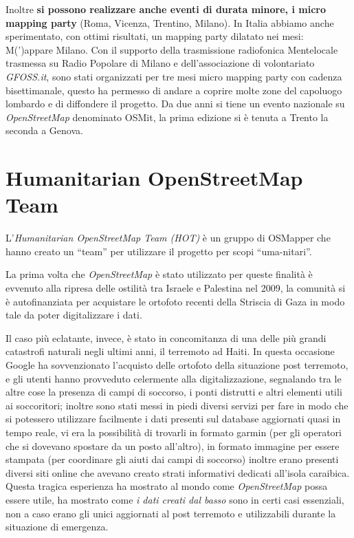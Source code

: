 \documentclass[a4paper,twoside,12pt,]{article}
\newcommand{\osm}{\emph{OpenStreetMap}\xspace}
\newcommand{\pro}[1]{\emph{#1}}
\begin{document}
Inoltre \textbf{si possono realizzare anche eventi di durata minore, i micro mapping party} (Roma, Vicenza, Trentino, Milano). In Italia abbiamo anche sperimentato, con ottimi risultati, un mapping party dilatato nei mesi: M(')appare Milano. Con il supporto della trasmissione radiofonica Mentelocale trasmessa su Radio Popolare di Milano e dell'associazione di volontariato \pro{GFOSS.it}, sono stati organizzati per tre mesi micro mapping party con cadenza bisettimanale, questo ha permesso di andare a coprire molte zone del capoluogo lombardo e di diffondere il progetto. Da due anni si tiene un evento nazionale su \osm denominato OSMit, la prima edizione si è tenuta a Trento la seconda a Genova.
\section{Humanitarian OpenStreetMap Team}
L'\pro{Humanitarian OpenStreetMap Team (HOT)} è un gruppo di OSMapper che hanno creato un ``team'' per utilizzare il progetto per scopi ``uma-nitari''.

La prima volta che \osm è stato utilizzato per queste finalità è evvenuto alla ripresa delle ostilità tra Israele e Palestina nel 2009, la comunità si è autofinanziata per acquistare le ortofoto recenti della Striscia di Gaza in modo tale da poter digitalizzare i dati.

Il caso più eclatante, invece, è stato in concomitanza di una delle più grandi catastrofi naturali negli ultimi anni, il terremoto ad Haiti. In questa occasione Google ha sovvenzionato l'acquisto delle ortofoto della situazione post terremoto, e gli utenti hanno provveduto celermente alla digitalizzazione, segnalando tra le altre cose la presenza di campi di soccorso, i ponti distrutti e altri elementi utili ai soccoritori; inoltre sono stati messi in piedi diversi servizi per fare in modo che si potessero utilizzare facilmente i dati presenti sul database aggiornati quasi in tempo reale, vi era la possibilità di trovarli in formato garmin (per gli operatori che si dovevano spostare da un posto all'altro), in formato immagine per essere stampata (per coordinare gli aiuti dai campi di soccorso) inoltre erano presenti diversi siti online che avevano creato strati informativi dedicati all'isola caraibica. Questa tragica esperienza ha mostrato al mondo come \osm possa essere utile, ha mostrato come \textit{i dati creati dal basso} sono in certi casi essenziali, non a caso erano gli unici aggiornati al post terremoto e utilizzabili durante la situazione di emergenza.
\end{document}
